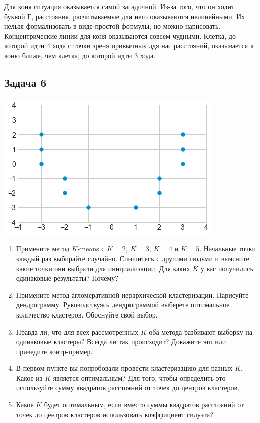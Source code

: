 \documentclass[12pt, a4paper, oneside]{article}
\begin{document}
{\begin{minipage}[t]{0.45\textwidth}
\end{minipage}

Для коня ситуация оказывается самой загадочной. Из-за того, что он ходит буквой Г, расстояния, расчитываемые для него оказываются нелинейными. Их нельзя формализовать в виде простой формулы, но можно нарисовать. Концентрические линии для коня оказываются совсем чудными. Клетка, до которой идти $4$ хода с точки зреня привычных ддя нас расстояний, оказывается к коню ближе, чем клетка, до которой идти $3$ хода. 
}{ }


\subsection*{Задача 6} 

\begin{center}
	\includegraphics[scale=0.6]{knn_3.png}
\end{center}

\begin{enumerate}
	\item Примените метод $K$-means с $K=2$, $K=3$, $K=4$ и $K=5$. Начальные точки каждый раз выбирайте случайно.  Спишитесь с другими людьми и выясните какие точки они выбрали для инициализации. Для каких $K$ у вас получились одинаковые результаты? Почему?  
	
	\item Примените метод агломеративной иерархической кластеризации. Нарисуйте дендрограмму. Руководствуясь дендрограммой выберете оптимальное количество кластеров. Обоснуйте свой выбор.
	
	\item Правда ли, что для всех рассмотренных $K$ оба метода разбивают выборку на одинаковые кластеры?  Всегда ли так происходит? Докажите это или приведите контр-пример. 
	
	\item В первом пункте вы попробовали провести кластеризацию для разных $K$. Какое из $K$ является оптимальным? Для того, чтобы определить это используйте сумму квадратов расстояний от точек до центров кластеров. 
	
	\item Какое $K$ будет оптимальным, если вместо суммы квадратов расстояний от точек до центров кластеров использовать коэффициент силуэта? 		
\end{enumerate}
\end{document}
